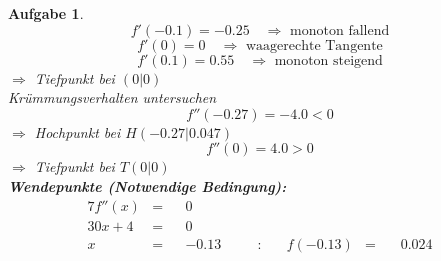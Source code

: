 \documentclass[12pt]{article}
\theoremstyle{note}
\newtheorem{aufgabe}{Aufgabe}
\begin{document}
\begin{flushleft}
\begin{aufgabe}
\vspace{1em}$$f'(-0.1)=-0.25\quad \Rightarrow \text{ monoton fallend} $$$$f'(0)=0 \quad \Rightarrow \text{ waagerechte Tangente} $$$$f'(0.1)=0.55\quad \Rightarrow \text{ monoton steigend} $$$\Rightarrow$ Tiefpunkt bei $(0|0)$ \\ 
\vspace{1em}{\em 3. M\"oglichkeit:} Kr\"ummungsverhalten untersuchen \\ 
$$f''(-0.27)=-4.0< 0 $$ 
$\Rightarrow$ Hochpunkt bei $H(-0.27|0.047)$ \\ 
$$f''(0)=4.0> 0 $$ 
$\Rightarrow$ Tiefpunkt bei $T(0|0)$ \\ 
{\bf Wendepunkte (Notwendige Bedingung):} 
\begin{alignat*}{7} 
f''(x)&=& &0& \\ 
30 x + 4&=& &0& \\ 
x&=& &-0.13& \quad &:& \quad f(-0.13)&=& \, &0.024\\ 
\end{alignat*} 


\end{aufgabe}
\end{flushleft}
\end{document}
